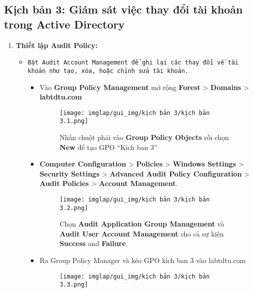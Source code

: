 \documentclass[13pt]{article}
\begin{document}
        \subsection{Kịch bản 3: Giám sát việc thay đổi tài khoản trong Active Directory}
        \begin{enumerate}
            \item \textbf{Thiết lập Audit Policy:}
            \begin{itemize}
                \item \texttt{Bật Audit Account Management để ghi lại các thay đổi về tài khoản như tạo, xóa, hoặc chỉnh sửa tài khoản.}
                \begin{itemize}
                    \item Vào \textbf{Group Policy Management} mở rộng \textbf{Forest} > \textbf{Domains} > \textbf{labtdtu.com}  
\begin{figure}[H]
                    \centering
                    \texttt{[image: imglap/gui\_img/kịch bản 3/kịch bản 3.1.png]}
                    \caption{Nhấn chuột phải vào \textbf{Group Policy Objects} rồi chọn \textbf{New }để tạo GPO “Kich ban 3” }
                    \label{fig:enter-label}
                \end{figure}
                \item \textbf{Computer Configuration} > \textbf{Policies} > \textbf{Windows Settings} > \textbf{Security Settings} > \textbf{Advanced Audit Policy Configuration} > \textbf{Audit Policies} > \textbf{Account Management}. 
\begin{figure}[H]
                                    \centering
                                    \texttt{[image: imglap/gui\_img/kịch bản 3/kịch bản 3.2.png]}
                                    \caption{Chọn \textbf{Audit Application Group Management} và \textbf{Audit User Account Management} cho cả sự kiện \textbf{Success }and \textbf{Failure} }
                                    \label{fig:enter-label}
                                \end{figure}
                                \item Ra Group Policy Manager và kéo GPO kich ban 3 vào labtdtu.com 
\begin{figure}[H]
                                    \centering
                                    \texttt{[image: imglap/gui\_img/kịch bản 3/kịch bản 3.3.png]}
                                    \caption{}
                                    \label{fig:enter-label}

\end{figure}
\end{itemize}
\end{itemize}
\end{enumerate}
\end{document}
